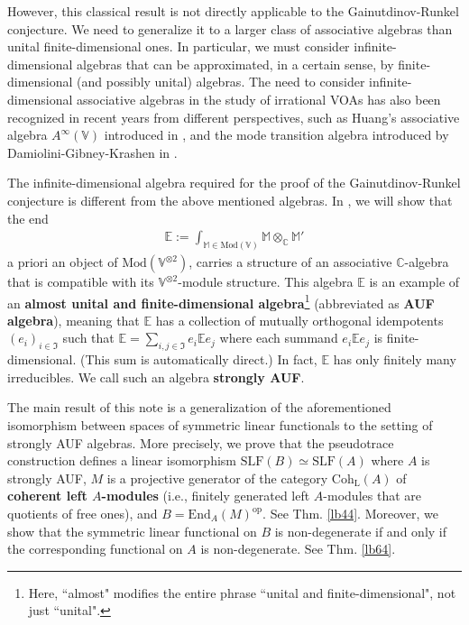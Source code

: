 \documentclass[11pt,b5paper,notitlepage]{article}
\theoremstyle{definition}
\theoremstyle{plain}
\newcommand{\fk}{\mathfrak}
\newcommand{\End}{\mathrm{End}} %
\newcommand{\opp}{\mathrm{op}}
\newcommand{\Vbb}{\mathbb V}
\newcommand{\Mbb}{\mathbb M}
\newcommand{\Cbb}{\mathbb C}
\newcommand{\Ebb}{\mathbb E}
\newcommand{\Mod}{\mathrm{Mod}}
\newcommand{\dps}{\displaystyle}
\newcommand{\Coh}{\mathrm{Coh}_{\mathrm L}}
\newcommand{\SLF}{\mathrm{SLF}}
\numberwithin{equation}{section}
\begin{document}
However, this classical result is not directly applicable to the Gainutdinov-Runkel conjecture. We need to generalize it to a larger class of associative algebras than unital finite-dimensional ones. In particular, we must consider infinite-dimensional algebras that can be approximated, in a certain sense, by finite-dimensional (and possibly unital) algebras. The need to consider infinite-dimensional associative algebras in the study of irrational VOAs has also been recognized in recent years from different perspectives, such as Huang's associative algebra $A^\infty(\Vbb)$ introduced in \cite{Hua-associative}, and the mode transition algebra introduced by Damiolini-Gibney-Krashen in \cite{DGK2}.


The infinite-dimensional algebra required for the proof of the Gainutdinov-Runkel conjecture is different from the above mentioned algebras. In \cite{GZ5}, we will show that the end
\begin{align*}
\dps\Ebb:=\int_{\Mbb\in\Mod(\Vbb)}\Mbb\otimes_\Cbb\Mbb'
\end{align*}
a priori an object of $\Mod(\Vbb^{\otimes2})$, carries a structure of an associative $\Cbb$-algebra that is compatible with its $\Vbb^{\otimes2}$-module structure. This algebra $\Ebb$ is an example of an \textbf{almost unital and finite-dimensional algebra}\footnote{Here, ``almost" modifies the entire phrase ``unital and finite-dimensional", not just ``unital".} (abbreviated as \textbf{AUF algebra}), meaning that $\Ebb$ has a collection of mutually orthogonal idempotents $(e_i)_{i\in\fk I}$ such that $\Ebb=\sum_{i,j\in\fk I}e_i\Ebb e_j$ where each summand $e_i\Ebb e_j$ is finite-dimensional. (This sum is automatically direct.) In fact, $\Ebb$ has only finitely many irreducibles. We call such an algebra \textbf{strongly AUF}.

The main result of this note is a generalization of the aforementioned isomorphism between spaces of symmetric linear functionals to the setting of strongly AUF algebras. More precisely, we prove that the pseudotrace construction defines a linear isomorphism $\SLF(B)\simeq\SLF(A)$ where $A$ is strongly AUF, $M$ is a projective generator of the category $\Coh(A)$ of \textbf{coherent left $A$-modules} (i.e., finitely generated left $A$-modules that are quotients of free ones), and $B=\End_A(M)^\opp$. See Thm. \ref{lb44}. Moreover, we show that the symmetric linear functional on $B$ is non-degenerate if and only if the corresponding functional on $A$ is non-degenerate. See Thm. \ref{lb64}.
\end{document}
